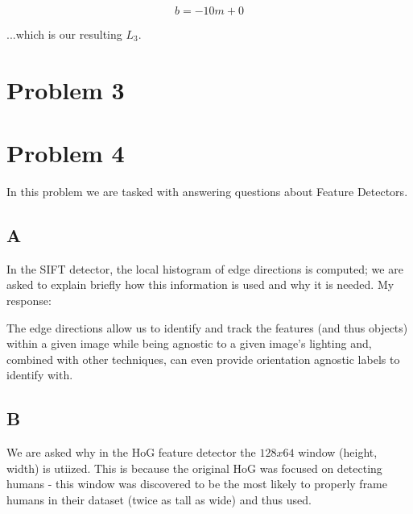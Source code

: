 \documentclass{article}
\begin{document}
\begin{equation}
    b = -10m + 0
\end{equation}

\noindent ...which is our resulting $L_3$.

\section*{Problem 3}

\section*{Problem 4}

In this problem we are tasked with answering questions about Feature Detectors.

\subsection*{A}

In the SIFT detector, the local histogram of edge directions is computed; we are asked to explain briefly how this information is used and why it is needed. My response:

The edge directions allow us to identify and track the features (and thus objects) within a given image while being agnostic to a given image's lighting and, combined with other techniques, can even provide orientation agnostic labels to identify with.

\subsection*{B}

We are asked why in the HoG feature detector the $128x64$ window (height, width) is utiized. This is because the original HoG was focused on detecting humans - this window was discovered to be the most likely to properly frame humans in their dataset (twice as tall as wide) and thus used.
\end{document}

